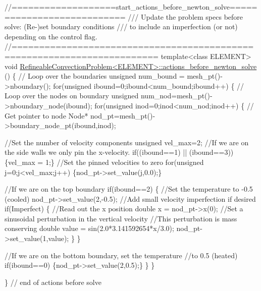  
\begin{DoxyCodeInclude}
\textcolor{comment}{//===================start\_actions\_before\_newton\_solve===========================}
\textcolor{comment}{/// Update the problem specs before solve: (Re-)set boundary conditions}
\textcolor{comment}{}\textcolor{comment}{/// to include an imperfection (or not) depending on the control flag.}
\textcolor{comment}{}\textcolor{comment}{//========================================================================}
\textcolor{keyword}{template}<\textcolor{keyword}{class} ELEMENT>
\textcolor{keywordtype}{void} \hyperlink{classRefineableConvectionProblem_a694f0be87fe09a30d94e92acfce85eee}{RefineableConvectionProblem<ELEMENT>::actions\_before\_newton\_solve}
      ()
\{
 \textcolor{comment}{// Loop over the boundaries}
 \textcolor{keywordtype}{unsigned} num\_bound = mesh\_pt()->nboundary();
 \textcolor{keywordflow}{for}(\textcolor{keywordtype}{unsigned} ibound=0;ibound<num\_bound;ibound++)
  \{
   \textcolor{comment}{// Loop over the nodes on boundary }
   \textcolor{keywordtype}{unsigned} num\_nod=mesh\_pt()->nboundary\_node(ibound);
   \textcolor{keywordflow}{for}(\textcolor{keywordtype}{unsigned} inod=0;inod<num\_nod;inod++)
    \{
     \textcolor{comment}{// Get pointer to node}
     Node* nod\_pt=mesh\_pt()->boundary\_node\_pt(ibound,inod);

     \textcolor{comment}{//Set the number of velocity components}
     \textcolor{keywordtype}{unsigned} vel\_max=2;
     \textcolor{comment}{//If we are on the side walls we only pin the x-velocity.}
     \textcolor{keywordflow}{if}((ibound==1) || (ibound==3)) \{vel\_max = 1;\}
     \textcolor{comment}{//Set the pinned velocities to zero}
     \textcolor{keywordflow}{for}(\textcolor{keywordtype}{unsigned} j=0;j<vel\_max;j++) \{nod\_pt->set\_value(j,0.0);\}

     \textcolor{comment}{//If we are on the top boundary}
     \textcolor{keywordflow}{if}(ibound==2) 
      \{
       \textcolor{comment}{//Set the temperature to -0.5 (cooled)}
       nod\_pt->set\_value(2,-0.5);
       \textcolor{comment}{//Add small velocity imperfection if desired}
       \textcolor{keywordflow}{if}(Imperfect)
        \{
         \textcolor{comment}{//Read out the x position}
         \textcolor{keywordtype}{double} x = nod\_pt->x(0);
         \textcolor{comment}{//Set a sinusoidal perturbation in the vertical velocity}
         \textcolor{comment}{//This perturbation is mass conserving}
         \textcolor{keywordtype}{double} value = sin(2.0*3.141592654*x/3.0);
         nod\_pt->set\_value(1,value);
        \}
      \}

     \textcolor{comment}{//If we are on the bottom boundary, set the temperature}
     \textcolor{comment}{//to 0.5 (heated)}
     \textcolor{keywordflow}{if}(ibound==0) \{nod\_pt->set\_value(2,0.5);\}
    \}
  \}

\}  \textcolor{comment}{// end of actions before solve}

\end{DoxyCodeInclude}




